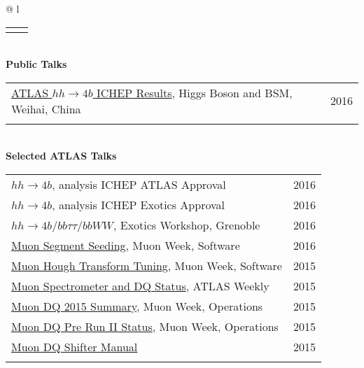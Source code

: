 \documentclass[letterpaper,11pt,oneside]{article}
\newcommand{\blue}[1]{\textcolor[rgb]{0,0,0.9}{#1}}
\begin{document}
\begin{flushleft}
\begin{tabular}{@{} l}
\begin{tabular}{@{} l l }
    \hspace{0.8\linewidth} & \hspace{0.1\linewidth} \\
     \end{tabular}
     \\
     \textbf{Public Talks} \\
     \begin{tabular}{@{} l l }
     \blue{\href{http://indico.ihep.ac.cn/event/5635/session/86/contribution/40}{ATLAS $hh\to4b$ ICHEP Results}}, Higgs Boson and BSM, Weihai, China & 2016\\
    \hspace{0.8\linewidth} & \hspace{0.1\linewidth} \\
      \end{tabular}
     \\
     \textbf{Selected ATLAS Talks} \\
     \begin{tabular}{@{} l l }
     \blue{\href{https://indico.cern.ch/event/558982/contributions/2255258}{$hh\to4b$}}, analysis ICHEP ATLAS Approval & 2016\\
     \blue{\href{https://indico.cern.ch/event/556566/contributions/2244051}{$hh\to4b$}}, analysis ICHEP Exotics Approval & 2016\\
     \blue{\href{https://indico.cern.ch/event/465157/contributions/1972449}{$hh\to4b / bb\tau\tau / bbWW$}}, Exotics Workshop, Grenoble & 2016\\
      \blue{\href{https://indico.cern.ch/event/570115/contributions/2305843}{Muon Segment Seeding}}, Muon Week, Software & 2016\\
     \blue{\href{https://indico.cern.ch/event/465396/contributions/1984207}{Muon Hough Transform Tuning}}, Muon Week, Software & 2015\\
     \blue{\href{https://indico.cern.ch/event/444054/contributions/1099850}{Muon Spectrometer and DQ Status}}, ATLAS Weekly & 2015\\
     \blue{\href{https://indico.cern.ch/event/464848/contributions/1983327}{Muon DQ 2015 Summary}}, Muon Week, Operations & 2015\\
     \blue{\href{https://indico.cern.ch/event/376175/contributions/893495}{Muon DQ Pre Run II Status}}, Muon Week, Operations & 2015\\
     \blue{\href{https://twiki.cern.ch/twiki/pub/Atlas/MuonOfflineDQShiftInstructions/Muondq_instruction_tony_2015spring.pdf}{Muon DQ Shifter Manual}} & 2015\\
     \hspace{0.8\linewidth} & \hspace{0.1\linewidth} \\
      \end{tabular}
      \end{tabular}
\end{flushleft}
\end{document}
